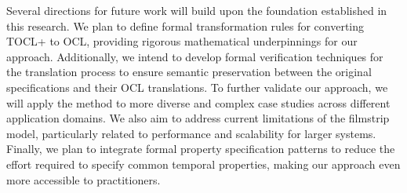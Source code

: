 Several directions for future work will build upon the foundation established in this 
research. We plan to define formal transformation rules for converting TOCL+ to OCL, 
providing rigorous mathematical underpinnings for our approach. Additionally, we intend 
to develop formal verification techniques for the translation process to ensure semantic 
preservation between the original specifications and their OCL translations. To further 
validate our approach, we will apply the method to more diverse and complex case studies 
across different application domains. We also aim to address current limitations of the 
filmstrip model, particularly related to performance and scalability for larger systems. 
Finally, we plan to integrate formal property specification patterns to reduce the effort 
required to specify common temporal properties, making our approach even more accessible 
to practitioners.




